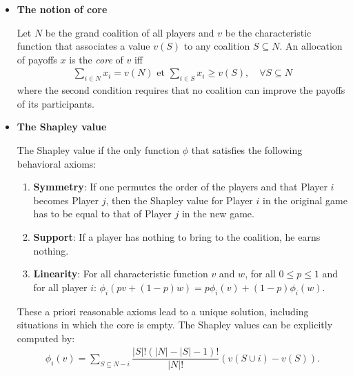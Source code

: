 \documentclass[a4paper,notitlepage,11pt]{article}
\begin{document}
\begin{itemize}[leftmargin=*]
\renewcommand{\labelitemi}{$\bullet$}

	
	\item \textbf{The notion of core}
	\vspace{.3cm}

	Let $N$ be the grand coalition of all players and $v$ be the characteristic function that associates a value $v (S)$ to any coalition $S \subseteq N$. An allocation of payoffs $x$ is the \emph{core} of $v$ iff
	\begin{align*}
		\sum_{i \in N}{x_i} = v(N) \text{ et } \sum_{i\in S}{x_i} \geq v(S), \quad \forall S \subseteq N
	\end{align*} 
	where the second condition requires that no coalition can improve the payoffs of its participants.

	\vspace{.3cm}
	\item \textbf{The Shapley value}
	\vspace{.3cm}
	
	The Shapley value if the only function $\phi$ that satisfies the following behavioral axioms:
	\begin{enumerate}
		\item \textbf{Symmetry}: If one permutes the order of the players and that Player $i$ becomes Player $j$, then the Shapley value for Player $i$ in the original game has to be equal to that of Player $j$ in the new game.
		\item \textbf{Support}: If a player has nothing to bring to the coalition, he earns nothing.
		\item \textbf{Linearity}: For all characteristic function $v$ and $w$, for all $0 \leq p \leq 1$ and for all player $i$: $\phi_i(pv + (1-p)w) = p\phi_i(v) + (1-p)\phi_i(w)$.
	\end{enumerate}
	These a priori reasonable axioms lead to a unique solution, including situations in which the core is empty. The Shapley values can be explicitly computed by:
	\begin{align*}
		\phi_i(v) = \sum_{S \subseteq N -i}{\dfrac{|S|!(|N| - |S| - 1)!}{|N|!} (v(S \cup {i}) - v(S))}.
	\end{align*}
	
\end{itemize}
\end{document}
